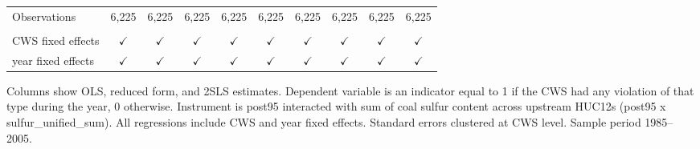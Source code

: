 \begin{table}[htbp]
\begin{adjustbox}{width = \textwidth, center}
\begin{tabular}{lccccccccc}
          \\
         
         Observations                                             & 6,225          & 6,225           & 6,225          & 6,225          & 6,225          & 6,225         & 6,225          & 6,225          & 6,225\\  
         
          \\
         
         CWS fixed effects                                        & $\checkmark$   & $\checkmark$    & $\checkmark$   & $\checkmark$   & $\checkmark$   & $\checkmark$  & $\checkmark$   & $\checkmark$   & $\checkmark$\\   
         year fixed effects                                       & $\checkmark$   & $\checkmark$    & $\checkmark$   & $\checkmark$   & $\checkmark$   & $\checkmark$  & $\checkmark$   & $\checkmark$   & $\checkmark$\\   
         
         \bottomrule
         
      \end{tabular}
      
      
      
   \end{adjustbox}
      {\tiny\linespread{1}\selectfont \par \raggedright 
   Columns show OLS, reduced form, and 2SLS estimates. Dependent variable is an indicator equal to 1 if the CWS had any violation of that type during the year, 0 otherwise. Instrument is post95 interacted with sum of coal sulfur content across upstream HUC12s (post95 x sulfur\_unified\_sum). All regressions include CWS and year fixed effects. Standard errors clustered at CWS level. Sample period 1985--2005.}
   
\end{table}


